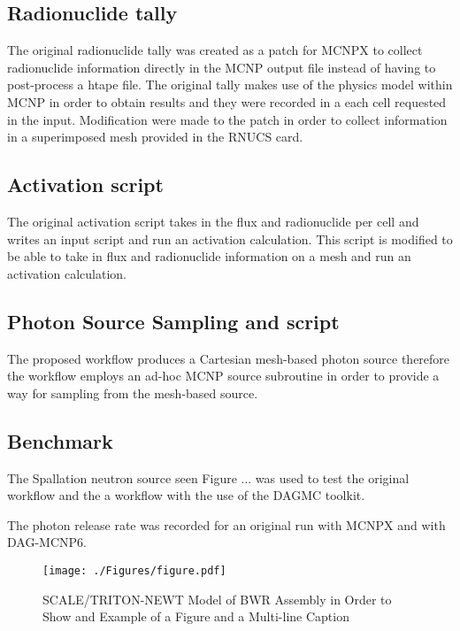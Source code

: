 \documentclass[letterpaper]{mandc2019}
\begin{document}
\subsection{Radionuclide tally }

The original radionuclide tally was created as a patch for MCNPX to 
collect radionuclide information directly in the MCNP output file 
instead of having to post-process a htape file. 
The original tally makes use of the physics model within MCNP 
in order to obtain results and they were recorded in a each 
cell requested in the input. 
Modification were made to the patch in order to collect information in 
a superimposed mesh provided in the RNUCS card. 

\subsection{Activation script}
The original activation script takes in the flux and radionuclide per cell and 
writes an input script and run an activation calculation. 
This script is modified to be able to take in flux and radionuclide information 
on a mesh and run an activation calculation. 

\subsection{Photon Source Sampling and script}
The proposed workflow produces a Cartesian mesh-based photon source therefore 
the workflow employs an ad-hoc MCNP source subroutine in order to provide a
way for sampling from the mesh-based source. 



\subsection{Benchmark}
The Spallation neutron source seen Figure ... was used to test the original 
workflow and the a  workflow with the use of the DAGMC toolkit. 

The photon release rate was recorded for an original run with MCNPX and with 
DAG-MCNP6. 





\begin{figure}[!htb]
  \centering
  \texttt{[image: ./Figures/figure.pdf]}
  \caption{SCALE/TRITON-NEWT Model of BWR Assembly in Order to Show and Example of a Figure and a Multi-line Caption}   
  \label{fig:amdahl}
\end{figure}
\end{document}
